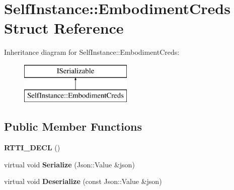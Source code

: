 \hypertarget{struct_self_instance_1_1_embodiment_creds}{}\section{Self\+Instance\+:\+:Embodiment\+Creds Struct Reference}
\label{struct_self_instance_1_1_embodiment_creds}
Inheritance diagram for Self\+Instance\+:\+:Embodiment\+Creds\+:\begin{figure}[H]
\begin{center}
\leavevmode
\includegraphics[height=2.000000cm]{struct_self_instance_1_1_embodiment_creds}
\end{center}
\end{figure}
\subsection*{Public Member Functions}
\begin{DoxyCompactItemize}
\item 
\mbox{\label{struct_self_instance_1_1_embodiment_creds_a7cc3466ec2599fcd3b0fc7fead37c192}} 
{\bfseries R\+T\+T\+I\+\_\+\+D\+E\+CL} ()
\item 
\mbox{\label{struct_self_instance_1_1_embodiment_creds_a10bbd6007d6aab5e0d1ca5cc779c3a70}} 
virtual void {\bfseries Serialize} (Json\+::\+Value \&json)
\item 
\mbox{\label{struct_self_instance_1_1_embodiment_creds_a99bb8a19d9523161b19ddc1b62563748}} 
virtual void {\bfseries Deserialize} (const Json\+::\+Value \&json)
\end{DoxyCompactItemize}
